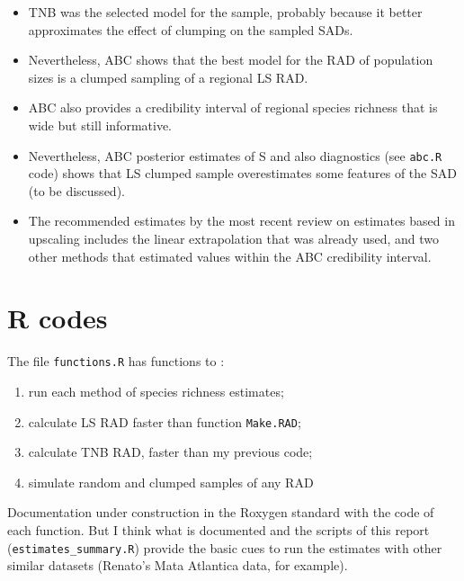 \documentclass[12pt, A4]{article}\usepackage[]{graphicx}\usepackage[]{color}
\newcommand{\code}[1]{\texttt{#1}}
\begin{document}
\begin{itemize}
\item TNB was the selected model for the sample, probably because it better approximates the
  effect of clumping on the sampled SADs. 
\item Nevertheless, ABC shows that the best model for the RAD of population sizes is a clumped sampling of a regional LS RAD. 
\item ABC also provides a credibility interval of regional species richness that is wide but still informative.
\item Nevertheless, ABC posterior estimates of S and also diagnostics (see \code{abc.R} code) 
  shows that LS clumped sample overestimates some features of the SAD (to be discussed).
\item The recommended estimates by the most recent review on estimates based in upscaling \citep{kunin2018} 
  includes the linear extrapolation
  that was already used, and two other methods that estimated values within the ABC credibility interval.
\end{itemize}

\section{R codes}

\label{sec:r-codes}
 The file \code{functions.R} has functions to :
 \begin{enumerate}
 \item run each method of species richness estimates;
 \item calculate LS RAD faster than function \code{Make.RAD};
 \item calculate TNB RAD, faster than my previous code;
 \item simulate random and clumped samples of any RAD   
 \end{enumerate}
 
Documentation under construction in the Roxygen standard with the code of each function.
But I think what is documented and the scripts of this report (\code{estimates\_summary.R}) provide the basic cues
to run the estimates with other similar datasets (Renato's Mata Atlantica data, for example).



\end{document}
